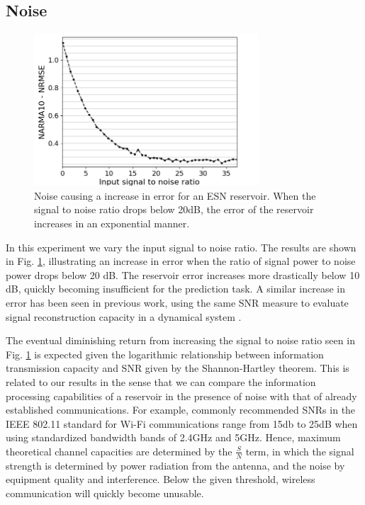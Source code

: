 \subsection{Noise}

\begin{figure}[t!]
  \centering
  \includegraphics[width=3.3in]{img/input_noise_snr.png}
  \caption{
    Noise causing a increase in error for an ESN reservoir. When the signal to
noise ratio drops below 20dB, the error of the reservoir increases in an
exponential manner.
  }
  \label{input_noise_snr}
\end{figure}

In this experiment we vary the input signal to noise ratio. The results are
shown in Fig. \ref{input_noise_snr}, illustrating an increase in error when the
ratio of signal power to noise power drops below 20 dB. The reservoir error
increases more drastically below 10 dB, quickly becoming insufficient for the
prediction task. A similar increase in error has been seen in previous work,
using the same SNR measure to evaluate signal reconstruction capacity in a
dynamical system \cite{dambre_information_2012}.

The eventual diminishing return from increasing the signal to noise ratio seen
in Fig. \ref{input_noise_snr} is expected given the logarithmic relationship
between information transmission capacity and SNR given by the Shannon-Hartley
theorem. This is related to our results in the sense that we can compare the
information processing capabilities of a reservoir in the presence of noise with
that of already established communications. For example, commonly recommended
SNRs in the IEEE 802.11 standard for Wi-Fi communications range from 15db to
25dB when using standardized bandwidth bands of 2.4GHz and 5GHz. Hence, maximum
theoretical channel capacities are determined by the $\frac{S}{N}$ term, in
which the signal strength is determined by power radiation from the antenna, and
the noise by equipment quality and interference. Below the given threshold,
wireless communication will quickly become unusable.

